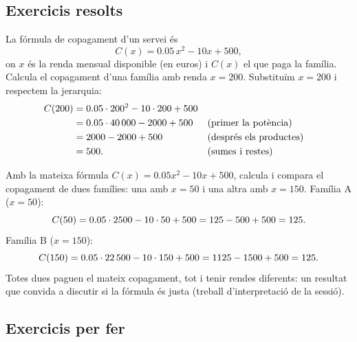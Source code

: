 \subsection{Exercicis resolts}

\begin{exresolt}
La fórmula de copagament d'un servei és
\[
C(x) = \num{0,05}\,x^2 - 10x + 500,
\]
on $x$ és la renda mensual disponible (en euros) i $C(x)$ el que paga la família.
Calcula el copagament d'una família amb renda $x=200$.
\solucio
Substituïm $x=200$ i respectem la jerarquia:
\begin{align*}
C(200) &= \num{0,05}\cdot 200^2 - 10\cdot 200 + 500 \\
       &= \num{0,05}\cdot \num{40000} - \num{2000} + 500 &&\text{(primer la potència)}\\
       &= \num{2000} - \num{2000} + 500 &&\text{(després els productes)}\\
       &= 500. &&\text{(sumes i restes)}
\end{align*}
\end{exresolt}

\begin{exresolt}
Amb la mateixa fórmula $C(x)=\num{0,05}x^2-10x+500$, calcula i compara el
copagament de dues famílies: una amb $x=50$ i una altra amb $x=150$.
\solucio
Família A ($x=50$):
\[
C(50)=\num{0,05}\cdot 2500 - 10\cdot 50 + 500 = 125 - 500 + 500 = 125.
\]
Família B ($x=150$):
\[
C(150)=\num{0,05}\cdot \num{22500} - 10\cdot 150 + 500 = \num{1125} - \num{1500} + 500 = 125.
\]
Totes dues paguen el mateix copagament, tot i tenir rendes diferents: un resultat
que convida a discutir si la fórmula és justa (treball d'interpretació de la sessió).
\end{exresolt}

\subsection{Exercicis per fer}

